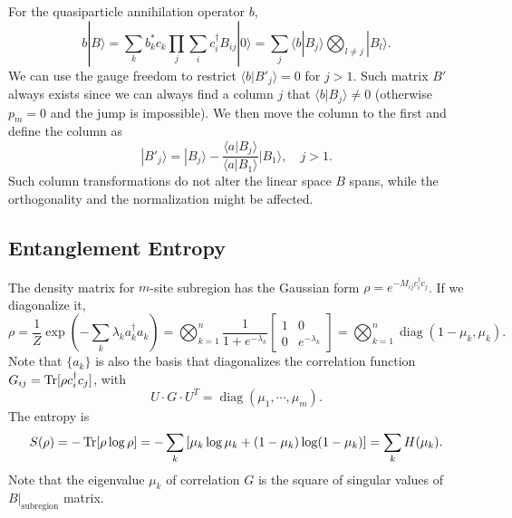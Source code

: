 \documentclass{SciPost}
\begin{document}
For the quasiparticle annihilation operator $b$, 
\begin{equation*}
	b|B\rangle = \sum_k b_k^* c_k \prod_{j} \sum_i c_i^\dagger B_{ij} |0\rangle
	=\sum_j \langle b|B_j\rangle \bigotimes_{l\ne j}|B_l\rangle.
\end{equation*}
We can use the gauge freedom to restrict $\langle b| B'_{j}\rangle = 0$ for $j>1$. Such matrix $B'$ always exists since we can always find a column $j$ that $\langle b| B_{j}\rangle \ne 0$ (otherwise $p_m=0$ and the jump is impossible). We then move the column to the first and define the column as
\begin{equation}
	|B'_{j}\rangle = |B_{j}\rangle - \frac{\langle a|B_{j}\rangle}{\langle a|B_{1}\rangle} |B_{1}\rangle, \quad j>1.
\end{equation}
Such column transformations do not alter the linear space $B$ spans, while the orthogonality and the normalization might be affected. 


\subsection{Entanglement Entropy}
The density matrix for $m$-site subregion has the Gaussian form $\rho = e^{-M_{ij}c_i^\dagger c_j}$. If we diagonalize it, 
\begin{equation}
	\rho = \frac{1}{Z}\exp(-\sum_k \lambda_k a_k^\dagger a_k) 
	= \bigotimes_{k=1}^n \frac{1}{1+e^{-\lambda_k}} 
	\begin{bmatrix} 1 & 0 \\ 0 & e^{-\lambda_k} \end{bmatrix} 
	= \bigotimes_{k=1}^n \operatorname{diag}(1-\mu_k, \mu_k).
\end{equation}
Note that $\{a_k\}$ is also the basis that diagonalizes the correlation function $G_{ij} = \operatorname{Tr}[\rho c_i^\dagger c_j]$, with
\begin{equation}
	U \cdot G \cdot U^T = \operatorname{diag}(\mu_1,\cdots,\mu_m).
\end{equation}
The entropy is
\begin{equation}
	S(\rho) = -\operatorname{Tr}[\rho \log \rho] 
	= -\sum_k \left[\mu_k \log\mu_k + (1-\mu_k)\log(1-\mu_k)\right] 
	= \sum_k H(\mu_k).
\end{equation}
Note that the eigenvalue $\mu_k$ of correlation $G$ is the square of singular values of $B|_\text{subregion}$ matrix.
\end{document}
